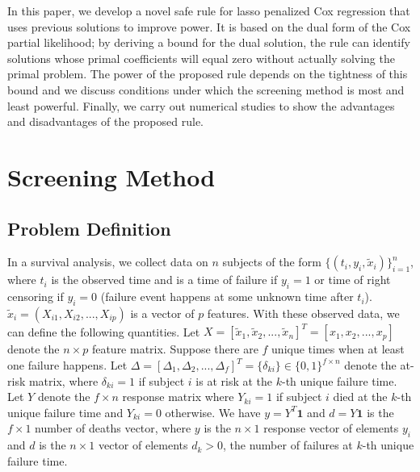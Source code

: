 In this paper, we develop a novel safe rule for lasso penalized Cox regression that uses previous solutions to improve power. It is based on the dual form of the Cox partial likelihood; by deriving a bound for the dual solution, the rule can identify solutions whose primal coefficients will equal zero without actually solving the primal problem. The power of the proposed rule depends on the tightness of this bound and we discuss conditions under which the screening method is most and least powerful. Finally, we carry out numerical studies to show the advantages and disadvantages of the proposed rule.

\section{Screening Method}
\subsection{Problem Definition}

In a survival analysis, we collect data on $n$ subjects of the form $\{(t_i,y_i,\tilde{x}_i)\}_{i=1}^n$, where $t_i$ is the observed time and is a time of failure if $y_i=1$ or time of right censoring if $y_i=0$ (failure event happens at some unknown time after $t_i$). $\tilde{x}_i=(X_{i1},X_{i2},...,X_{ip})$ is a vector of $p$ features. With these observed data, we can define the following quantities. Let $X=[\tilde{x}_1,\tilde{x}_2,...,\tilde{x}_n]^T=[x_1,x_2,...,x_p]$ denote the $n\times p$ feature matrix. Suppose there are $f$ unique times when at least one failure happens. Let  $\Delta=[\Delta_1,\Delta_2,...,\Delta_f]^T=\{\delta_{ki}\}\in\{0,1\}^{f\times n}$ denote the at-risk matrix, where $\delta_{ki}=1$ if subject $i$ is at risk at the $k$-th unique failure time. Let $Y$ denote the $f\times n$ response matrix where $Y_{ki}=1$ if subject $i$ died at the $k$-th unique failure time and $Y_{ki}=0$ otherwise. We have $y=Y^T\mathbf{1}$ and $d=Y\mathbf{1}$ is the $f\times 1$ number of deaths vector, where $y$ is the $n\times1$ response vector of elements $y_i$ and $d$ is the $n\times1$ vector of elements $d_k>0$, the number of failures at $k$-th unique failure time.

